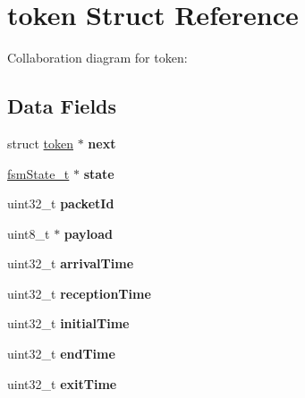 \hypertarget{structtoken}{}\section{token Struct Reference}
\label{structtoken}


Collaboration diagram for token\+:
\subsection*{Data Fields}
\begin{DoxyCompactItemize}
\item 
struct \hyperlink{structtoken}{token} $\ast$ {\bfseries next}\hypertarget{structtoken_ab58ee0c791a215865addb101d174b38a}{}\label{structtoken_ab58ee0c791a215865addb101d174b38a}

\item 
\hyperlink{structfsmState}{fsm\+State\+\_\+t} $\ast$ {\bfseries state}\hypertarget{structtoken_aec07f13a99ecdf3cda4d2cbc55a8c6cd}{}\label{structtoken_aec07f13a99ecdf3cda4d2cbc55a8c6cd}

\item 
uint32\+\_\+t {\bfseries packet\+Id}\hypertarget{structtoken_af02d2489fc1c79212e53604665bd855d}{}\label{structtoken_af02d2489fc1c79212e53604665bd855d}

\item 
uint8\+\_\+t $\ast$ {\bfseries payload}\hypertarget{structtoken_a30dd7ad6373270a5dea061fca6f6cab1}{}\label{structtoken_a30dd7ad6373270a5dea061fca6f6cab1}

\item 
uint32\+\_\+t {\bfseries arrival\+Time}\hypertarget{structtoken_afb1fa91490df79df3c0e121092115eb3}{}\label{structtoken_afb1fa91490df79df3c0e121092115eb3}

\item 
uint32\+\_\+t {\bfseries reception\+Time}\hypertarget{structtoken_a36ce2585ae3d7cc472194b7751d77bfd}{}\label{structtoken_a36ce2585ae3d7cc472194b7751d77bfd}

\item 
uint32\+\_\+t {\bfseries initial\+Time}\hypertarget{structtoken_a64b1adea4f1b6a6f9de22e505b1d78b7}{}\label{structtoken_a64b1adea4f1b6a6f9de22e505b1d78b7}

\item 
uint32\+\_\+t {\bfseries end\+Time}\hypertarget{structtoken_a49c881db530c919a711b2201a1705098}{}\label{structtoken_a49c881db530c919a711b2201a1705098}

\item 
uint32\+\_\+t {\bfseries exit\+Time}\hypertarget{structtoken_a437303ca56b235cc97d4d6f076f2608f}{}\label{structtoken_a437303ca56b235cc97d4d6f076f2608f}


\end{DoxyCompactItemize}

